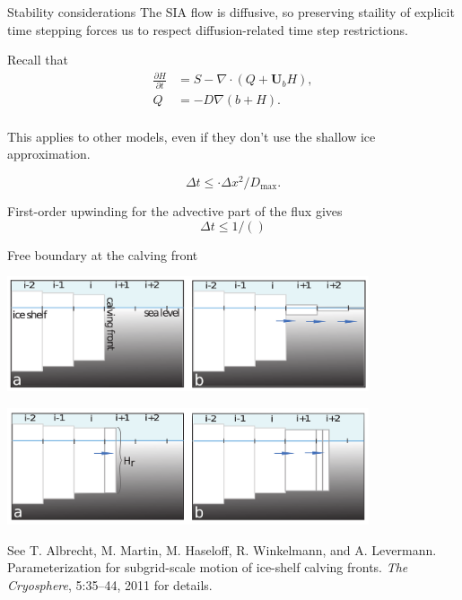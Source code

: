 \documentclass[hide notes,intlimits]{beamer}
\begin{document}
\begin{frame}{Stability considerations}
  The SIA flow is diffusive, so preserving staility of explicit time
  stepping forces us to respect diffusion-related time step
  restrictions.

  Recall that
  \begin{align}
    \label{eq:2}
    \frac{\partial H}{\partial t} &= S - \nabla \cdot (Q + \mathbf{U}_b H),\\
    Q &= -D \nabla (b + H).\\
  \end{align}

  This applies to other models, even if they don't use the shallow ice
  approximation.

  \begin{equation}
    \label{eq:3}
    \Delta t \le \cdot \Delta x^{2} / D_{\text{max}}.
  \end{equation}

  First-order upwinding for the advective part of the flux gives
  \begin{equation}
    \label{eq:6}
    \Delta t \le 1 / ()
  \end{equation}
\end{frame}

\begin{frame}{Free boundary at the calving front}
  \begin{center}
    \includegraphics[width=0.8\textwidth]{albrecht-martin-figure-1}

    \includegraphics[width=0.8\textwidth]{albrecht-martin-figure-2}
  \end{center}

  See T. Albrecht, M. Martin, M. Haseloff, R. Winkelmann, and A.
  Levermann. Parameterization for subgrid-scale motion of ice-shelf
  calving fronts. \emph{The Cryosphere}, 5:35–44, 2011 for details.
\end{frame}
\end{document}
